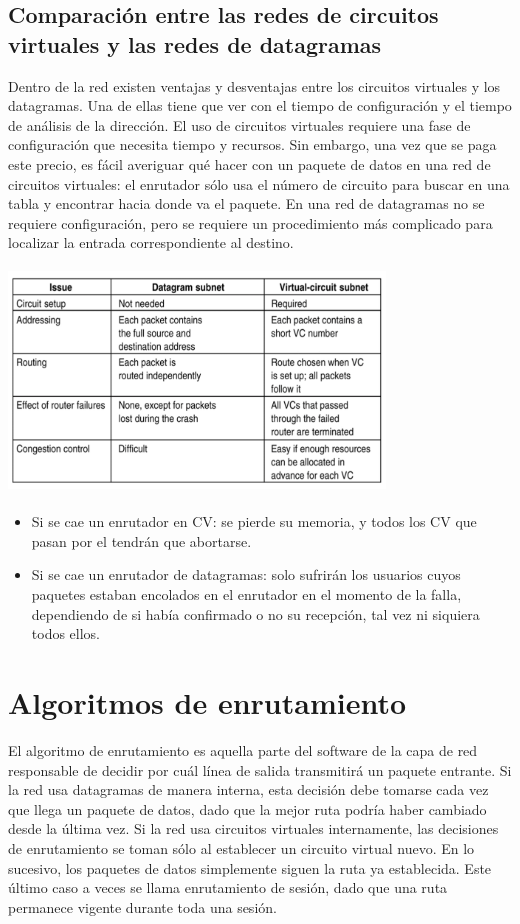 \subsection{Comparación entre las redes de circuitos virtuales y las redes de datagramas}
	Dentro de la red existen ventajas y desventajas entre los circuitos virtuales y los 
	datagramas. Una de ellas tiene que ver con el tiempo de configuración y el tiempo de 
	análisis de la dirección. El uso de circuitos virtuales requiere una fase de 
	configuración que necesita tiempo y recursos. Sin embargo, una vez que se paga 
	este precio, es fácil averiguar qué hacer con un paquete de datos en una red de 
	circuitos virtuales: el enrutador sólo usa el número de circuito para buscar en una 
	tabla y encontrar hacia donde va el paquete. En una red de datagramas no se 
	requiere configuración, pero se requiere un procedimiento más complicado para 
	localizar la entrada correspondiente al destino.

	\begin{center} 
		\includegraphics[width=10cm, height=6cm]{./imagenes/comparacion.png}
	\end{center}
	
	\begin{itemize}
		\item Si se cae un enrutador en CV: se pierde su memoria, y todos los CV que 
		pasan por el tendrán que abortarse.
		\item Si se cae un enrutador de datagramas: solo sufrirán los usuarios cuyos 
		paquetes estaban encolados en el enrutador en el momento de la falla, 
		dependiendo de si había confirmado o no su recepción, tal vez ni siquiera todos 
		ellos.
	\end{itemize}


\section{Algoritmos de enrutamiento}
	\par El algoritmo de enrutamiento es aquella parte del software de la capa de red 
	responsable de decidir por cuál línea de salida transmitirá un paquete entrante. Si la 
	red usa datagramas de manera interna, esta decisión debe tomarse cada vez que 
	llega un paquete de datos, dado que la mejor ruta podría haber cambiado desde la 
	última vez. Si la red usa circuitos virtuales internamente, las decisiones de 
	enrutamiento se toman sólo al establecer un circuito virtual nuevo. En lo sucesivo, 
	los paquetes de datos simplemente siguen la ruta ya establecida. Este último caso a 
	veces se llama enrutamiento de sesión, dado que una ruta permanece vigente 
	durante toda una sesión.
	
